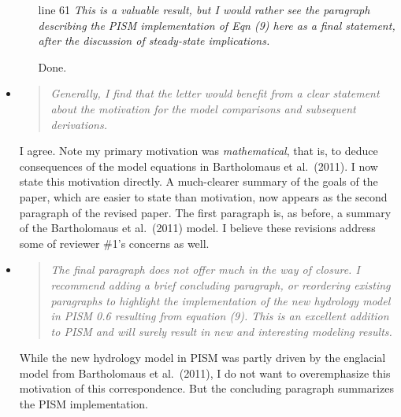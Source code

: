 \documentclass[11pt,reqno]{amsart}
\newcommand{\reply}[2]{
\medskip\medskip
\item  \begin{quote}
\emph{#1}
\end{quote}

\medskip
\noindent #2}
\begin{document}
\begin{itemize}
{\begin{itemize}
\quad I have replaced the idea of ``rare'' with ``small''.  That is, violations of the $P\le (\rho_w/\rho_i) P_o$ bound are possible but are unlikely to be large (in a relative-to-overburden sense) or have long duration or large area.  In any case, supraglacial geysers are outside the scope of the simpler models under consideration.

\item[line 61]  \emph{This is a valuable result, but I would rather see the paragraph describing the PISM implementation of Eqn (9) here as a final statement, after the discussion of steady-state implications.}

\quad Done.
\end{itemize}}

\reply{Generally, I find that the letter would benefit from a clear statement about the motivation for the model comparisons and subsequent derivations.}
{I agree.  Note my primary motivation was \emph{mathematical}, that is, to deduce consequences of the model equations in Bartholomaus et al.~(2011).  I now state this motivation directly.  A much-clearer summary of the goals of the paper, which are easier to state than motivation, now appears as the second paragraph of the revised paper.  The first paragraph is, as before, a summary of the Bartholomaus et al.~(2011) model.  I believe these revisions address some of reviewer \#1's concerns as well.}

\reply{The final paragraph does not offer much in the way of closure.  I recommend adding a brief concluding paragraph, or reordering existing paragraphs to highlight the implementation of the new hydrology model in PISM 0.6 resulting from equation (9).  This is an excellent addition to PISM and will surely result in new and interesting modeling results.}
{While the new hydrology model in PISM was partly driven by the englacial model from Bartholomaus et al.~(2011), I do not want to overemphasize this motivation of this correspondence.  But the concluding paragraph summarizes the PISM implementation.}
\end{itemize}
\end{document}
